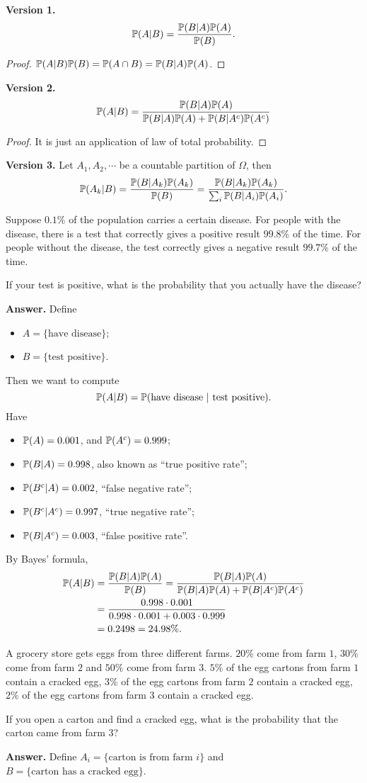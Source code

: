 \textbf{Version 1.}
\[
  \mathbb{P}(A|B) = \frac{\mathbb{P}(B|A)\mathbb{P}(A)}{\mathbb{P}(B)}.
\]
\begin{proof}
  $\mathbb{P}(A|B) \mathbb{P}(B) = \mathbb{P}(A\cap B) = \mathbb{P}(B|A) \mathbb{P}(A)$.
\end{proof}
\textbf{Version 2.}
\[
  \mathbb{P}(A|B) = \frac{\mathbb{P}(B|A) \mathbb{P}(A)}{\mathbb{P}(B|A)\mathbb{P}(A) + \mathbb{P}(B|A^c) \mathbb{P}(A^c)}
\]
\begin{proof}
  It is just an application of law of total probability. 
\end{proof}
\textbf{Version 3.} Let $A_1,A_2,\cdots$ be a countable partition of $\Omega$,
then
\[
  \mathbb{P}(A_k|B) = \frac{\mathbb{P}(B|A_k)\mathbb{P}(A_k)}{\mathbb{P}(B)} = \frac{\mathbb{P}(B|A_k)\mathbb{P}(A_k)}{\sum_i\mathbb{P}(B|A_i)\mathbb{P}(A_i)}.
\]
\begin{example}
  Suppose $0.1\%$ of the population carries a certain disease. For people with
  the disease, there is a test that correctly gives a positive result $99.8\%$
  of the time. For people without the disease, the test correctly gives a
  negative result $99.7\%$ of the time.

  If your test is positive, what is the probability that you actually have the disease?
\end{example}
\textbf{Answer.} Define
\begin{itemize}
\item $A = \{\text{have disease}\}$;
\item $B = \{\text{test positive}\}$.
\end{itemize}
Then we want to compute
\[
  \mathbb{P}(A|B) = \mathbb{P}(\text{have disease}~|~\text{test positive}).
\]
Have
\begin{itemize}
\item $\mathbb{P}(A) = 0.001$, and $\mathbb{P}(A^c) = 0.999$;
\item $\mathbb{P}(B|A) = 0.998$, also known as ``true positive rate'';
\item $\mathbb{P}(B^c|A) = 0.002$, ``false negative rate'';
\item $\mathbb{P}(B^c|A^c) = 0.997$, ``true negative rate'';
\item $\mathbb{P}(B|A^c) = 0.003$, ``false positive rate''.
\end{itemize}
By Bayes' formula,
\begin{align*}
  \mathbb{P}(A|B) & = \frac{\mathbb{P}(B|A)\mathbb{P}(A)}{\mathbb{P}(B)} = \frac{\mathbb{P}(B|A)\mathbb{P}(A)}{\mathbb{P}(B|A)\mathbb{P}(A) + \mathbb{P}(B|A^c) \mathbb{P}(A^c)}\\
           & = \frac{0.998\cdot 0.001}{0.998\cdot 0.001 + 0.003 \cdot 0.999}\\
  & = 0.2498 = 24.98\%.
\end{align*}
\begin{example}
  A grocery store gets eggs from three different farms. $20\%$ come from farm
  $1$, $30\%$ come from farm $2$ and $50\%$ come from farm $3$. $5\%$ of the egg
  cartons from farm $1$ contain a cracked egg, $3\%$ of the egg
  cartons from farm $2$ contain a cracked egg, $2\%$ of the egg
  cartons from farm $3$ contain a cracked egg.

  If you open a carton and find a cracked egg, what is the probability that the
  carton came from farm $3$?
\end{example}
\textbf{Answer.} Define $A_i = \{\text{carton is from farm $i$}\}$ and $B =
\{\text{carton has a cracked egg}\}$.

